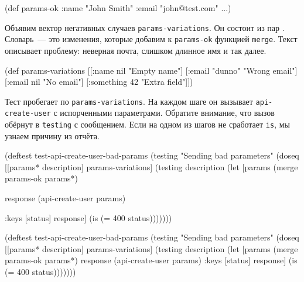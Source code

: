 \else

\begin{english}
  \begin{clojure}
(def params-ok {:name "John Smith"
                :email "john@test.com"
                ...})
  \end{clojure}
\end{english}

\fi

Объявим вектор негативных случаев \verb|params-variations|. Он состоит из пар
. Словарь~--- это изменения, которые добавим к
\verb|params-ok| функцией \verb|merge|. Текст описывает проблему: неверная
почта, слишком длинное имя и так далее.

\begin{english}
  \begin{clojure}
(def params-variations
  [[{:name nil}      "Empty name"]
   [{:email "dunno"} "Wrong email"]
   [{:email nil}     "No email"]
   [{:something 42}  "Extra field"]])
  \end{clojure}
\end{english}

Тест пробегает по \verb|params-variations|. На каждом шаге он вызывает
\verb|api-create-user| с испорченными параметрами. Обратите внимание, что вызов
обёрнут в \verb|testing| с сообщением. Если на одном из шагов не сработает
\verb|is|, мы узнаем причину из отчёта.

\pagebreakafive

\ifnarrow

\begin{english}
  \begin{clojure}
(deftest test-api-create-user-bad-params
  (testing "Sending bad parameters"
    (doseq [[params* description]
            params-variations]
      (testing description
        (let [params
              (merge params-ok params*)

              response
              (api-create-user params)

              {:keys [status]} response]
          (is (= 400 status)))))))
  \end{clojure}
\end{english}

\else

\begin{english}
  \begin{clojure}
(deftest test-api-create-user-bad-params
  (testing "Sending bad parameters"
    (doseq [[params* description] params-variations]
      (testing description
        (let [params (merge params-ok params*)
              response (api-create-user params)
              {:keys [status]} response]
          (is (= 400 status)))))))
  \end{clojure}
\end{english}

